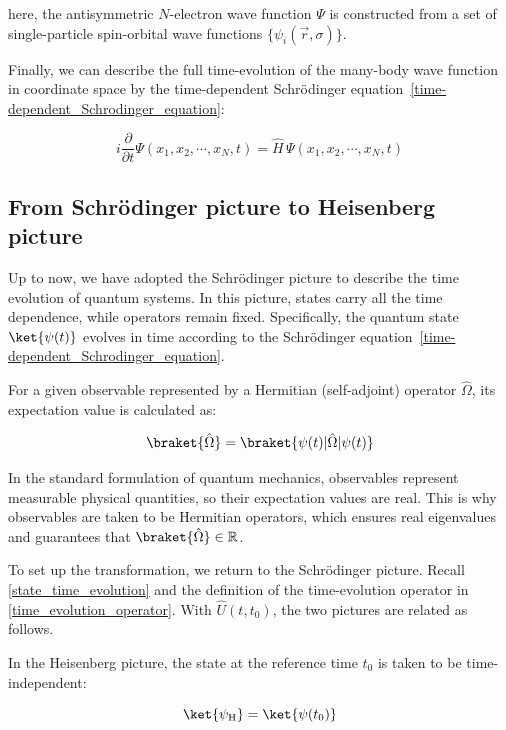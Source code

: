 here, the antisymmetric $N$-electron wave function $\Psi$ is constructed from a set of single-particle spin-orbital wave functions $\{\psi_i(\vec{r},\sigma)\}$.

Finally, we can describe the full time-evolution of the many-body wave function in coordinate space by the time-dependent Schrödinger equation~\eqref{time-dependent_Schrodinger_equation}:

\begin{equation}
    i\frac{\partial}{\partial t}\Psi(x_1,x_2,\cdots,x_N,t)
    = \hat{H}\,\Psi(x_1,x_2,\cdots,x_N,t)
\label{tdse_manybody_coord}
\end{equation}

\subsection{From Schrödinger picture to Heisenberg picture}

Up to now, we have adopted the Schrödinger picture to describe the time evolution of quantum systems. In this picture, states carry all the time dependence, while operators remain fixed. Specifically, the quantum state $\ket{\psi(t)}$ evolves in time according to the Schrödinger equation~\eqref{time-dependent_Schrodinger_equation}.

For a given observable represented by a Hermitian (self-adjoint) operator $\hat{\Omega}$, its expectation value is calculated as:

\begin{equation}
    \braket{\hat{\Omega}} = \braket{\psi(t)|\hat{\Omega}|\psi(t)}
\label{expectation_Hermitian}
\end{equation}

In the standard formulation of quantum mechanics, observables represent measurable physical quantities, so their expectation values are real.
This is why observables are taken to be Hermitian operators, which ensures real eigenvalues and guarantees that $\braket{\hat{\Omega}}\in\mathbb{R}$.

To set up the transformation, we return to the Schrödinger picture.
Recall \eqref{state_time_evolution} and the definition of the time-evolution operator in \eqref{time_evolution_operator}.
With $\hat{U}(t,t_0)$, the two pictures are related as follows.

In the Heisenberg picture, the state at the reference time $t_0$ is taken to be time-independent:

\begin{equation}
    \ket{\psi_\mathrm{H}}=\ket{\psi(t_0)}
\label{heisenberg_state_definition}
\end{equation}

